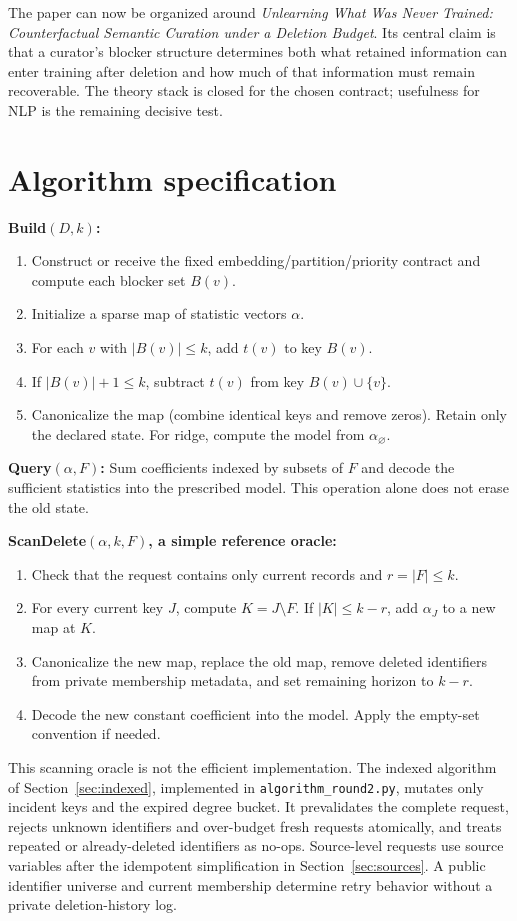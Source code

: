 \documentclass[11pt,a4paper]{article}
\theoremstyle{definition}\newtheorem{definition}[theorem]{Definition}
\newcommand{\minus}{\setminus}
\begin{document}
The paper can now be organized around \emph{Unlearning What Was Never Trained: Counterfactual Semantic Curation under a Deletion Budget}. Its central claim is that a curator's blocker structure determines both what retained information can enter training after deletion and how much of that information must remain recoverable. The theory stack is closed for the chosen contract; usefulness for NLP is the remaining decisive test.

\newpage
\appendix
\section{Algorithm specification}
\textbf{Build$(D,k)$:}
\begin{enumerate}
\item Construct or receive the fixed embedding/partition/priority contract and compute each blocker set $B(v)$.
\item Initialize a sparse map of statistic vectors $\alpha$.
\item For each $v$ with $|B(v)|\le k$, add $t(v)$ to key $B(v)$.
\item If $|B(v)|+1\le k$, subtract $t(v)$ from key $B(v)\cup\{v\}$.
\item Canonicalize the map (combine identical keys and remove zeros). Retain only the declared state. For ridge, compute the model from $\alpha_\varnothing$.
\end{enumerate}
\textbf{Query$(\alpha,F)$:} Sum coefficients indexed by subsets of $F$ and decode the sufficient statistics into the prescribed model. This operation alone does not erase the old state.

\textbf{ScanDelete$(\alpha,k,F)$, a simple reference oracle:}
\begin{enumerate}
\item Check that the request contains only current records and $r=|F|\le k$.
\item For every current key $J$, compute $K=J\minus F$. If $|K|\le k-r$, add $\alpha_J$ to a new map at $K$.
\item Canonicalize the new map, replace the old map, remove deleted identifiers from private membership metadata, and set remaining horizon to $k-r$.
\item Decode the new constant coefficient into the model. Apply the empty-set convention if needed.
\end{enumerate}
This scanning oracle is not the efficient implementation. The indexed algorithm of Section~\ref{sec:indexed}, implemented in \texttt{algorithm\_round2.py}, mutates only incident keys and the expired degree bucket. It prevalidates the complete request, rejects unknown identifiers and over-budget fresh requests atomically, and treats repeated or already-deleted identifiers as no-ops. Source-level requests use source variables after the idempotent simplification in Section~\ref{sec:sources}. A public identifier universe and current membership determine retry behavior without a private deletion-history log.
\end{document}
